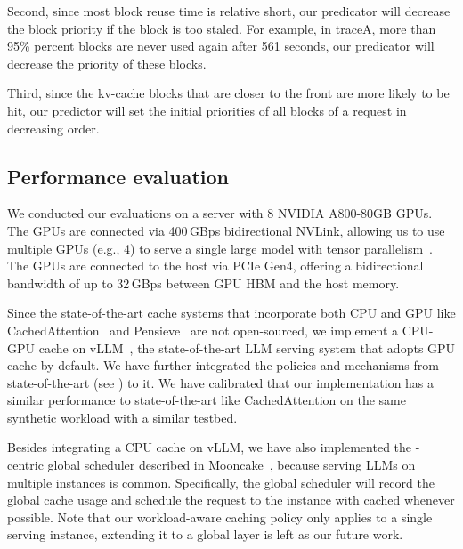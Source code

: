 Second, since most block reuse time is relative short, our predicator will decrease the
block priority if the block is too staled. For example, in traceA, more than 95\% percent 
blocks are never used again after 561 seconds, our predicator will decrease the priority of
these blocks.

Third, since the kv-cache blocks that are closer to the front are more likely to be hit, 
our predictor will set the initial priorities of all blocks of a request in decreasing order.
\fi


\subsection{Performance evaluation}
\label{sec:design-eval}

We conducted our evaluations on a server with 8 NVIDIA A800-80GB GPUs.
The GPUs are connected via 400\,GBps bidirectional NVLink, 
allowing us to use multiple GPUs (e.g., 4) to serve a single large model
with tensor parallelism~\cite{narayanan2021efficient}. 
The GPUs are connected to the host via PCIe Gen4, 
offering a bidirectional bandwidth of up to 32\,GBps
between GPU HBM and the host memory. 


Since the state-of-the-art {\kvcache} cache systems that
incorporate both CPU and GPU {\kvcache} like
CachedAttention~\cite{cachedattention} and Pensieve~\cite{DBLP:journals/corr/abs-2403-14401}
are not open-sourced,
we implement a CPU-GPU {\kvcache} cache on vLLM~\cite{vllm},
the state-of-the-art LLM serving system that adopts GPU {\kvcache} cache by default.
We have further integrated the policies and mechanisms from state-of-the-art
(see \textsection{\ref{sec:design-mechanism}}) to it.
We have calibrated that
our implementation has a similar performance to state-of-the-art like CachedAttention
on the same synthetic workload with a similar testbed.

Besides integrating a CPU {\kvcache} cache on vLLM,
we have also implemented the {\kvcache}-centric global scheduler described in Mooncake~\cite{mooncake},
because serving LLMs on multiple instances is common. 
Specifically, the global scheduler will record the global {\kvcache} cache usage
and schedule the request to the instance with cached {\kvcache} whenever possible. 
Note that our workload-aware caching policy only applies to a single serving instance,
extending it to a global layer is left as our future work. 

